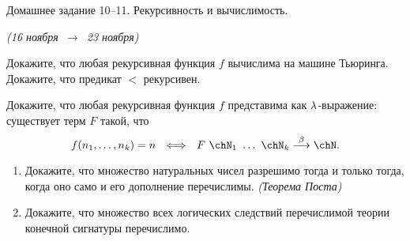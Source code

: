 \documentclass[a4paper,11pt]{article}
\begin{document}
   \newcommand{\enumsep}{\vspace{-2.8mm}
   		\begin{enumerate}[itemsep=0.4mm,leftmargin=2.5mm]}

\begin{center}
	{\Large Домашнее задание 10–11. Рекурсивность и вычислимость.}

	{\it (16 ноября\ \(\to\)\ 23 ноября)}
\end{center}


	\item Докажите, что любая рекурсивная функция \(f\) вычислима на машине Тьюринга. Докажите, что предикат $<$ рекурсивен.

	\item Докажите, что любая рекурсивная функция \(f\) представима как \(\lambda\)-выражение: существует терм \(F\) такой, что
		\[ f\lr*{n_1,\ldots,n_k} = n\ \ \Longleftrightarrow\ \ 
		   F\ \chN_1\ \ldots\ \chN_k \stackrel{\beta}{\longrightarrow} \chN.\]

	\item[4 а)]  \enumsep
		\item[ ] Докажите, что множество натуральных чисел разрешимо тогда и только тогда, когда оно само и его дополнение перечислимы. {\it (Теорема Поста)}
		\item[(б)] Докажите, что множество всех логических следствий перечислимой теории конечной сигнатуры перечислимо. \end{enumerate}
\end{document}
